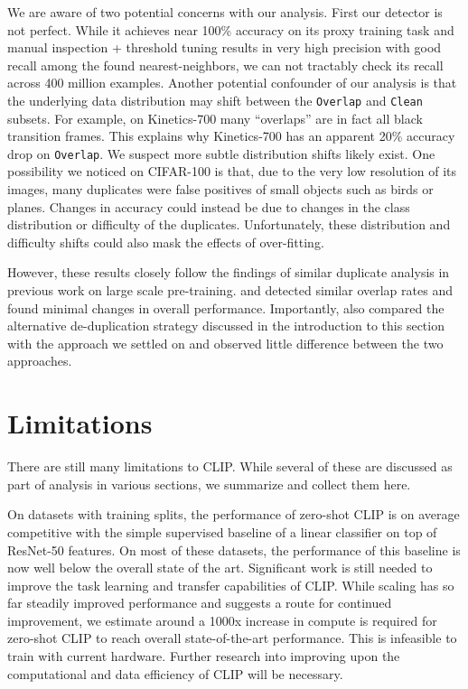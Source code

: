 \documentclass{article}
\begin{document}
We are aware of two potential concerns with our analysis. First our detector is not perfect. While it achieves near 100\% accuracy on its proxy training task and manual inspection + threshold tuning results in very high precision with good recall among the found nearest-neighbors, we can not tractably check its recall across 400 million examples. Another potential confounder of our analysis is that the underlying data distribution may shift between the \texttt{Overlap} and \texttt{Clean} subsets. For example, on Kinetics-700 many ``overlaps'' are in fact all black transition frames. This explains why Kinetics-700 has an apparent 20\% accuracy drop on \texttt{Overlap}. We suspect more subtle distribution shifts likely exist. One possibility we noticed on CIFAR-100 is that, due to the very low resolution of its images, many duplicates were false positives of small objects such as birds or planes. Changes in accuracy could instead be due to changes in the class distribution or difficulty of the duplicates. Unfortunately, these distribution and difficulty shifts could also mask the effects of over-fitting.

However, these results closely follow the findings of similar duplicate analysis in previous work on large scale pre-training. \citet{mahajan2018exploring} and \citet{kolesnikov2019large} detected similar overlap rates and found minimal changes in overall performance. Importantly, \citet{kolesnikov2019large} also compared the alternative de-duplication strategy discussed in the introduction to this section with the approach we settled on and observed little difference between the two approaches.



\section{Limitations}

There are still many limitations to CLIP. While several of these are discussed as part of analysis in various sections, we summarize and collect them here.

On datasets with training splits, the performance of zero-shot CLIP is on average competitive with the simple supervised baseline of a linear classifier on top of ResNet-50 features. On most of these datasets, the performance of this baseline is now well below the overall state of the art. Significant work is still needed to improve the task learning and transfer capabilities of CLIP. While scaling has so far steadily improved performance and suggests a route for continued improvement, we estimate around a 1000x increase in compute is required for zero-shot CLIP to reach overall state-of-the-art performance. This is infeasible to train with current hardware. Further research into improving upon the computational and data efficiency of CLIP will be necessary.
\end{document}
